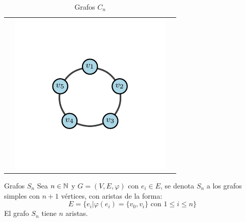 \begin{table}[H]
\begin{center}
\begin{tabular}{ccc}
                    &
                    \includegraphics{Sections/Graphs/GraphsImages/GraphsCn/C5.pdf}
                \end{tabular}
              \caption{Grafos $C_n$}
              \label{tbl:grafosCn}
            \end{center}
        \end{table}
        \begin{definition}{Grafos $S_n$}
            Sea $n\in\mathbb{N}$ y $G=(V,E,\varphi)$ con $e_i\in E$, se denota $S_n$ a los grafos simples con $n+1$ vértices, con aristas de la forma:
            $$E=\{e_i|\varphi(e_i)=\{v_0,v_i\}\text{ con }1\le i\le n\}$$
            El grafo $S_n$ tiene $n$ aristas.
        \end{definition}
